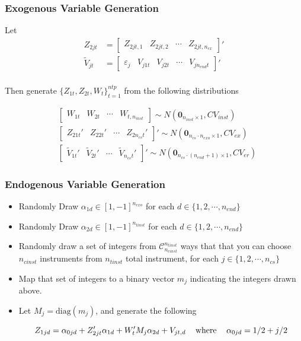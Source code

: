 \documentclass[9pt]{beamer}
\begin{document}
\begin{frame} 
\frametitle{Exogenous Variable Generation} 

Let 
$$ 
\begin{align*} 
Z_{2jt} &= \begin{bmatrix} Z_{2jt,1} & Z_{2jt,2} & \cdots & Z_{2jt,n_{ex}} \end{bmatrix}' \\[10pt]  
\tilde{V}_{jt} &= \begin{bmatrix}  \varepsilon_{j}  & V_{j1t} & V_{j2t}& \cdots & V_{jn_{end}t}\end{bmatrix}' \\[10pt]
\end{align*} 
$$

Then generate $\{Z_{1t},Z_{2t},W_t\}_{t=1}^{ntp}$ from the following distributions

\begin{align*}
& \begin{bmatrix} W_{1t} & W_{2t}& \cdots & W_{t,n_{inst}} \end{bmatrix} \sim N(\mathbf{0}_{n_{inst} \times 1}, CV_{inst}) \\[10pt]
%
&\begin{bmatrix} Z_{21t}' & Z_{22t}' & \cdots & Z_{2n_{cs}t}' \end{bmatrix}' \sim N(\mathbf{0}_{n_{cs} \cdot n_{exo} \times 1}, CV_{ex}) \\[10pt]
%
&\begin{bmatrix} \tilde{V}_{1t}' & \tilde{V}_{2t}' & \cdots & \tilde{V}_{n_{cs}t}' \end{bmatrix}' \sim N(\mathbf{0}_{n_{cs} \cdot (n_{end} +1) \times 1}, CV_{er})
\end{align*}
\end{frame}
\begin{frame} 
\frametitle{Endogenous Variable Generation} 

\begin{itemize}\addtolength{\itemsep}{\baselineskip}
    \item Randomly Draw $\alpha_{1d} \in [1,-1]^{n_{exo}} $ for each $d \in \{1,2,\cdots,n_{end} \}$    
    \item  Randomly Draw $\alpha_{2d} \in [1,-1]^{n_{tinst}} $ for each $d \in \{1,2,\cdots,n_{end} \}$  
    \item  Randomly draw a set of integers from $\mathcal{C}^{n_{tinst}}_{n_{cinst}}$ ways that that you can choose $n_{cinst}$ instruments from $n_{tinst}$ total instrument, for each  $j\in \{1,2,\cdots , n_{cs}\}$  
    \item  Map that set of integers to a binary vector $m_j$ indicating the integers drawn above. 
    \item  Let $M_j = \text{diag}(m_j)$, and generate the following
 
    
    $$ Z_{1jd} =  \alpha_{0jd} + Z_{2jt}' \alpha_{1d} + W_{t}'M_j \alpha_{2d} + V_{jt,d} \hspace{.3cm} \text{ where } \hspace{.3cm} \alpha_{0jd} = 1/2+j/2 $$ 
  

\end{itemize}   
\end{frame}
\end{document}
